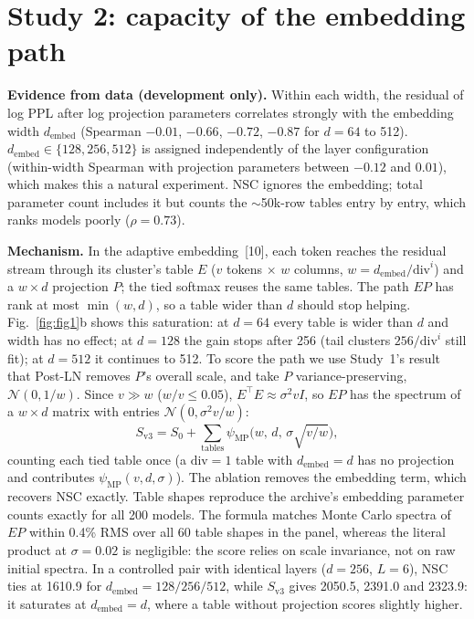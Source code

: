 \documentclass[a4paper,12pt]{article}
\newcommand{\psimp}{\psi_{\mathrm{MP}}}
\begin{document}
\section{Study 2: capacity of the embedding path}
\textbf{Evidence from data (development only).} Within each width, the residual of log PPL after log projection parameters correlates strongly with the embedding width $d_{\mathrm{embed}}$ (Spearman $-0.01$, $-0.66$, $-0.72$, $-0.87$ for $d=64$ to 512). $d_{\mathrm{embed}}\in\{128,256,512\}$ is assigned independently of the layer configuration (within-width Spearman with projection parameters between $-0.12$ and $0.01$), which makes this a natural experiment. NSC ignores the embedding; total parameter count includes it but counts the $\sim$50k-row tables entry by entry, which ranks models poorly ($\rho=0.73$).

\textbf{Mechanism.} In the adaptive embedding~[10], each token reaches the residual stream through its cluster's table $E$ ($v$ tokens $\times$ $w$ columns, $w=d_{\mathrm{embed}}/\text{div}^i$) and a $w\times d$ projection $P$; the tied softmax reuses the same tables. The path $EP$ has rank at most $\min(w,d)$, so a table wider than $d$ should stop helping. Fig.~\ref{fig:fig1}b shows this saturation: at $d=64$ every table is wider than $d$ and width has no effect; at $d=128$ the gain stops after 256 (tail clusters $256/\text{div}^i$ still fit); at $d=512$ it continues to 512. To score the path we use Study~1's result that Post-LN removes $P$'s overall scale, and take $P$ variance-preserving, $\mathcal N(0,1/w)$. Since $v\gg w$ ($w/v\le0.05$), $E^\top E\approx\sigma^2vI$, so $EP$ has the spectrum of a $w\times d$ matrix with entries $\mathcal N(0,\sigma^2v/w)$:
\begin{equation*}
S_{\text{v3}}=S_0+\textstyle\sum_{\text{tables}}\psimp\bigl(w,\,d,\,\sigma\sqrt{v/w}\bigr),
\end{equation*}
counting each tied table once (a $\text{div}=1$ table with $d_{\mathrm{embed}}=d$ has no projection and contributes $\psimp(v,d,\sigma)$). The ablation removes the embedding term, which recovers NSC exactly. Table shapes reproduce the archive's embedding parameter counts exactly for all 200 models. The formula matches Monte Carlo spectra of $EP$ within 0.4\% RMS over all 60 table shapes in the panel, whereas the literal product at $\sigma=0.02$ is negligible: the score relies on scale invariance, not on raw initial spectra. In a controlled pair with identical layers ($d=256$, $L=6$), NSC ties at 1610.9 for $d_{\mathrm{embed}}=128/256/512$, while $S_{\text{v3}}$ gives 2050.5, 2391.0 and 2323.9: it saturates at $d_{\mathrm{embed}}=d$, where a table without projection scores slightly higher.
\end{document}

